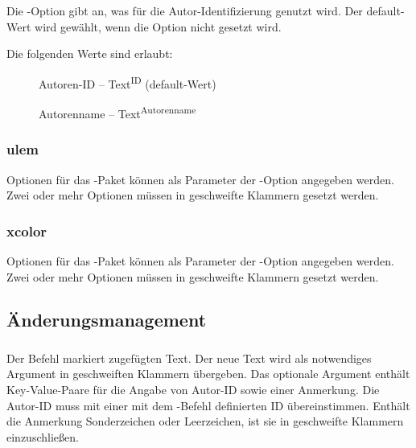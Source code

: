 Die -Option gibt an, was für die Autor-Identifizierung genutzt wird.
Der default-Wert wird gewählt, wenn die Option nicht gesetzt wird.

Die folgenden Werte sind erlaubt:
\begin{description}
	\item [] Autoren-ID -- Text\textsuperscript{ID} (default-Wert)
	\item [] Autorenname -- Text\textsuperscript{Autorenname}
\end{description}




\subsubsection{ulem}

Optionen für das -Paket können als Parameter der -Option angegeben werden.
Zwei oder mehr Optionen müssen in geschweifte Klammern gesetzt werden.




\subsubsection{xcolor}

Optionen für das -Paket können als Parameter der -Option angegeben werden.
Zwei oder mehr Optionen müssen in geschweifte Klammern gesetzt werden.





\subsection{Änderungsmanagement}
\label{sec:user:changemanagement}

\subsubsection{}
\DescribeMacro{\added}

Der Befehl  markiert zugefügten Text.
Der neue Text wird als notwendiges Argument in geschweiften Klammern übergeben.
Das optionale Argument enthält Key-Value-Paare für die Angabe von Autor-ID sowie einer Anmerkung.
Die Autor-ID muss mit einer mit dem -Befehl definierten ID übereinstimmen.
Enthält die Anmerkung Sonderzeichen oder Leerzeichen, ist sie in geschweifte Klammern einzuschließen.

